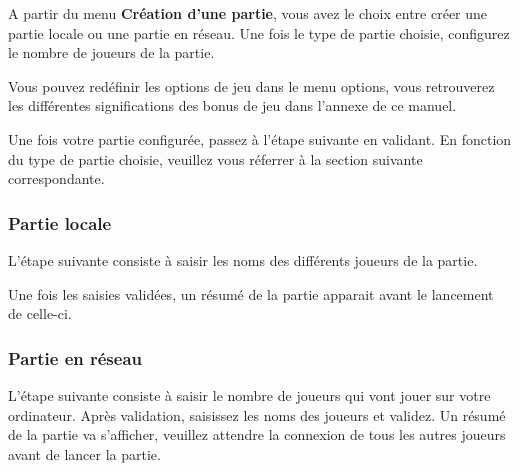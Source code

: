 	A partir du menu \textbf{Création d'une partie}, vous avez le choix entre créer une partie locale ou une partie en réseau.
Une fois le type de partie choisie, configurez le nombre de joueurs de la partie. 


Vous pouvez redéfinir les options de jeu dans le menu options, vous retrouverez les différentes significations des bonus de jeu dans l'annexe de ce manuel.


Une fois votre partie configurée, passez à l'étape suivante en validant. En fonction du type de partie choisie, veuillez vous réferrer à la section suivante correspondante.

	\subsubsection{Partie locale}
		L'étape suivante consiste à saisir les noms des différents joueurs de la partie. 
		
		Une fois les saisies validées, un résumé de la partie apparait avant le lancement de celle-ci.
		
	\subsubsection{Partie en réseau}
		L'étape suivante consiste à saisir le nombre de joueurs qui vont jouer sur votre ordinateur.
		Après validation, saisissez les noms des joueurs et validez.
		Un résumé de la partie va s'afficher, veuillez attendre la connexion de tous les autres joueurs avant de lancer la partie.
		
